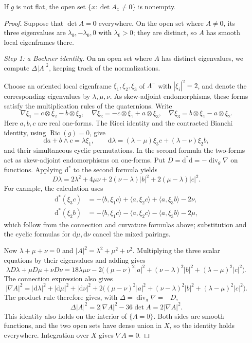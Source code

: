 \begin{lemma}\label{lem:ricci-flat-nonzero-determinant}
If $g$ is not flat, the open set $\{x:\det A_x\ne0\}$ is nonempty.
\end{lemma}
\begin{proof}
Suppose that $\det A=0$ everywhere. On the open set where $A\ne0$, its three eigenvalues are $\lambda_0,-\lambda_0,0$ with $\lambda_0>0$; they are distinct, so $A$ has smooth local eigenframes there.

\emph{Step 1: a Bochner identity.} On an open set where $A$ has distinct eigenvalues, we compute $\Delta|A|^2$, keeping track of the normalizations.

Choose an oriented local eigenframe $\xi_1,\xi_2,\xi_3$ of $\Lambda^-$ with $|\xi_i|^2=2$, and denote the corresponding eigenvalues by $\lambda,\mu,\nu$. As skew-adjoint endomorphisms, these forms satisfy the multiplication rules of the quaternions. Write
\[
 \nabla\xi_1=c\otimes\xi_2-b\otimes\xi_3,\quad
 \nabla\xi_2=-c\otimes\xi_1+a\otimes\xi_3,\quad
 \nabla\xi_3=b\otimes\xi_1-a\otimes\xi_2.
\]
Here $a,b,c$ are real one-forms. The Ricci identity and the contracted Bianchi identity, using $\operatorname{Ric}(g)=0$, give
\[
 \mathrm da+b\wedge c=\lambda\xi_1,\qquad
 \mathrm d\lambda=(\lambda-\mu)\xi_3c+(\lambda-\nu)\xi_2b,
\]
and their simultaneous cyclic permutations. In the second formula the two-forms act as skew-adjoint endomorphisms on one-forms. Put $D=\mathrm d^*\mathrm d=-\operatorname{div}_g\nabla$ on functions. Applying $\mathrm d^*$ to the second formula yields
\[
 D\lambda=2\lambda^2+4\mu\nu
          +2(\nu-\lambda)|b|^2+2(\mu-\lambda)|c|^2.
\]
For example, the calculation uses
\begin{align*}
 \mathrm d^*(\xi_3c)&=-\langle b,\xi_1c\rangle
       +\langle a,\xi_2c\rangle+\langle a,\xi_3b\rangle-2\nu,\\
 \mathrm d^*(\xi_2b)&=-\langle b,\xi_1c\rangle
       -\langle a,\xi_2c\rangle-\langle a,\xi_3b\rangle-2\mu,
\end{align*}
which follow from the connection and curvature formulas above; substitution and the cyclic formulas for $\mathrm d\mu,\mathrm d\nu$ cancel the mixed pairings.

Now $\lambda+\mu+\nu=0$ and $|A|^2=\lambda^2+\mu^2+\nu^2$. Multiplying the three scalar equations by their eigenvalues and adding gives
\[
 \lambda D\lambda+\mu D\mu+\nu D\nu
 =18\lambda\mu\nu-2\bigl((\mu-\nu)^2|a|^2
                  +(\nu-\lambda)^2|b|^2+(\lambda-\mu)^2|c|^2\bigr).
\]
The connection expression also gives
\[
 |\nabla A|^2=|\mathrm d\lambda|^2+|\mathrm d\mu|^2+|\mathrm d\nu|^2
       +2\bigl((\mu-\nu)^2|a|^2+(\nu-\lambda)^2|b|^2
                                      +(\lambda-\mu)^2|c|^2\bigr).
\]
The product rule therefore gives, with $\Delta=\operatorname{div}_g\nabla=-D$,
\begin{equation}\label{eq:ricci-flat-weyl-norm}
 \Delta|A|^2=2|\nabla A|^2-36\det A=2|\nabla A|^2.
\end{equation}
This identity also holds on the interior of $\{A=0\}$. Both sides are smooth functions, and the two open sets have dense union in $X$, so the identity holds everywhere. Integration over $X$ gives $\nabla A=0$.


\end{proof}
